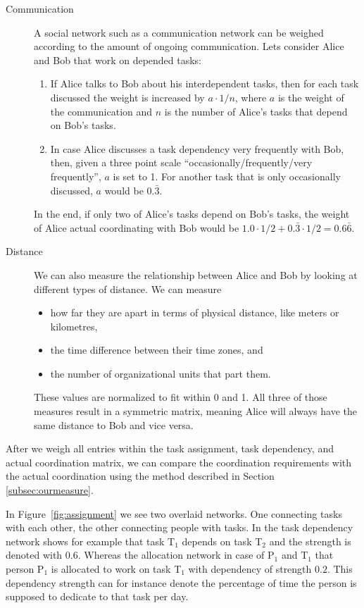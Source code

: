 \documentclass[times, 10pt,twocolumn]{article}
\begin{document}
\begin{description}
\item[Communication] A social network such as a communication network can be weighed according to the amount of ongoing communication. Lets consider Alice and Bob that work on depended tasks:
\begin{enumerate}
	\item If Alice talks to Bob about his interdependent tasks, then for each task discussed the weight is increased by $a\cdot1/n$, where $a$ is the weight of the communication and $n$ is the number of Alice's tasks that depend on Bob's tasks.
	\item In case Alice discusses a task dependency very frequently with  Bob, then, given a three point scale ``occasionally/frequently/very frequently'', $a$ is set to 1. For another task that is only occasionally discussed, $a$ would be $0.\bar{3}$.
\end{enumerate}
In the end, if only two of Alice's tasks depend on Bob's tasks, the weight of Alice actual coordinating with Bob would be $1.0\cdot1/2+ 0.\bar{3}\cdot1/2= 0.6\bar{6}$.

\item[Distance] 
We can also measure the relationship between Alice and Bob by looking at different types of distance.
We can measure
\begin{itemize}
\item how far they are apart in terms of physical distance, like meters or kilometres,
\item the time difference between their time zones, and
\item the number of organizational units that part them.
\end{itemize}
These values are normalized to fit within 0 and 1. All three of those measures result in a symmetric matrix, meaning Alice will always have the same distance to Bob and vice versa.
\end{description}
	
After we weigh all entries within the task assignment, task dependency, and actual coordination matrix, we can compare the coordination requirements with the actual coordination using the method described in Section \ref{subsec:ourmeasure}.

In Figure~\ref{fig:assignment} we see two overlaid networks.
One connecting tasks with each other, the other connecting people with tasks.
In the task dependency network shows for example that task T$_1$ depends on task T$_2$ and the strength is denoted with $0.6$.
Whereas the allocation network in case of P$_1$ and T$_1$ that  person P$_1$ is allocated to work on task T$_1$ with dependency of strength $0.2$.
This dependency strength can for instance denote the percentage of time the person is supposed to dedicate to that task per day.
\end{document}
